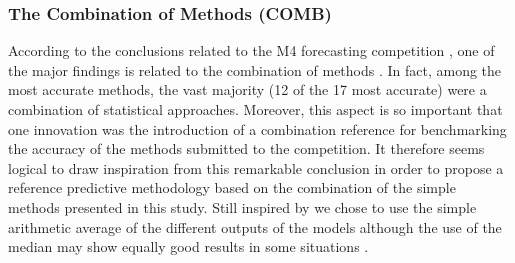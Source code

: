 \subsubsection{The Combination of Methods \textnormal{(COMB)}}
\label{sec:comb}
According to the conclusions related to the M4 forecasting competition \citep{article4}, one of the major findings is related to the combination of methods \citep{SPILIOTIS202159}. In fact, among the most accurate methods, the vast majority (12 of the 17 most accurate) were a combination of statistical approaches. Moreover, this aspect is so important that one innovation was the introduction of a combination reference for benchmarking the accuracy of the methods submitted to the competition. It therefore seems logical to draw inspiration from this remarkable conclusion in order to propose a reference predictive methodology based on the combination of the simple methods presented in this study. Still inspired by \cite{article4} we chose to use the simple arithmetic average of the different outputs of the models although the use of the median may show equally good results in some situations \citep{article5}. %


